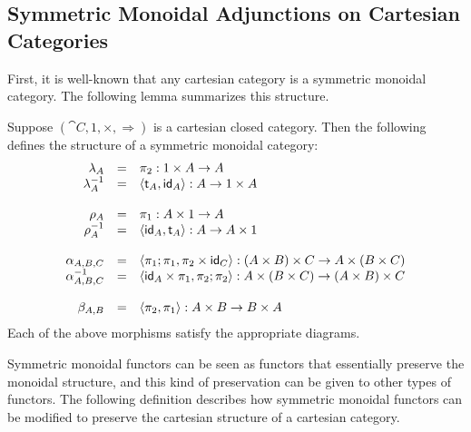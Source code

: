 \subsection{Symmetric Monoidal Adjunctions on Cartesian Categories}
\label{subsec:symmetric_monoidal_adjunctions_on_cartesian_categories}
First, it is well-known that any cartesian category is a symmetric
monoidal category. The following lemma summarizes this structure.
\begin{lemma}
  \label{lemma:CCC-is-SMC}
  Suppose $(\cat{C}, 1, \times, \Rightarrow)$ is a cartesian closed
  category.  Then the following defines the structure of a symmetric
  monoidal category:
  \[
  \begin{array}{rll}
    \lambda_A & = & \pi_2 : 1 \times A \mto A\\
    \lambda^{-1}_A & = & \langle \t_A , \id_A  \rangle : A \mto 1 \times A\\
    \\
    \rho_A & = & \pi_1 : A \times 1 \mto A\\
    \rho^{-1}_A & = & \langle \id_A , \t_A  \rangle : A \mto A \times 1\\
    \\
    \alpha_{A,B,C} & = & \langle \pi_1;\pi_1, \pi_2 \times \id_C \rangle : (A \times B) \times C \mto A \times (B \times C)\\
    \alpha^{-1}_{A,B,C} & = & \langle \id_A \times \pi_1, \pi_2;\pi_2 \rangle : A \times (B \times C) \mto (A \times B) \times C\\
    \\
    \beta_{A,B} & = & \langle \pi_2, \pi_1 \rangle : A \times B \mto B \times A\\
  \end{array}
  \]
  Each of the above morphisms satisfy the appropriate diagrams.
\end{lemma}

Symmetric monoidal functors can be seen as functors that essentially
preserve the monoidal structure, and this kind of preservation can be
given to other types of functors.  The following definition describes
how symmetric monoidal functors can be modified to preserve the
cartesian structure of a cartesian category.

